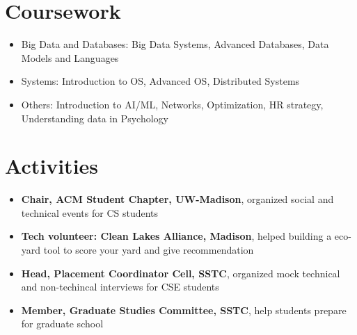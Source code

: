 \documentclass{resume}
\begin{document}
\section{Coursework}
\begin{itemize}[parsep=0.5ex]
  \item Big Data and Databases: Big Data Systems, Advanced Databases, Data Models and Languages
  \item Systems: Introduction to OS, Advanced OS, Distributed Systems
  \item Others: Introduction to AI/ML, Networks, Optimization, HR strategy, Understanding data in Psychology
\end{itemize}


\section{Activities}
\begin{itemize}
  \item \textbf{Chair, ACM Student Chapter, UW-Madison}, organized social and technical events for CS students
  \item \textbf{Tech volunteer: Clean Lakes Alliance, Madison}, helped building a eco-yard tool to score your yard and give recommendation
  \item \textbf{Head, Placement Coordinator Cell, SSTC}, organized mock technical and non-techincal interviews for CSE students
  \item \textbf{Member, Graduate Studies Committee, SSTC}, help students prepare for graduate school
\end{itemize}

%
%
\end{document}
